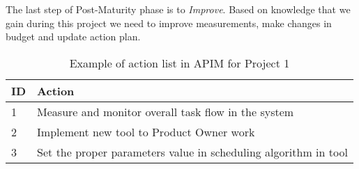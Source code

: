 The last step of Post-Maturity phase is to \textit{Improve}. Based on knowledge that we gain during this project we need to improve measurements, make changes in budget and update action plan. 



\begin{center}
\begin{table}
\caption{Example of action list in APIM for Project 1}
\label{tab:actionList}
\begin{tabular}{ | l | p{7cm} | }
 ID & Action \\ \hline
\rule{0pt}{3ex}1 & Measure and monitor overall task flow in the system \\
\rule{0pt}{3ex}2 & Implement new tool to Product Owner work\\
\rule{0pt}{3ex}3 & Set the proper parameters value in scheduling algorithm in tool\\ 
\end{tabular}

\end{table}
\end{center}


